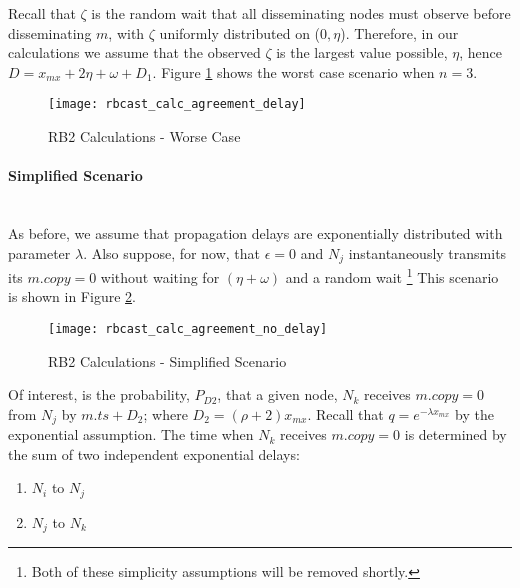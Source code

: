     Recall that $\zeta$ is the random wait that all disseminating nodes must observe before disseminating $m$, with $\zeta$ uniformly distributed on ($0, \eta$).  Therefore, in our calculations we assume that the observed $\zeta$ is the largest value possible, $\eta$, hence $D = x_{mx} + 2\eta + \omega + D_1$.  Figure \ref{fig:rbcast_a_delay} shows the worst case scenario when $n=3$.  
    
    \begin{figure}[H]
                \centering    
                \centerline{\texttt{[image: rbcast\_calc\_agreement\_delay]}}
                \caption[RB2 Calculations - Worse Case]{RB2 Calculations - Worse Case}
                 \label{fig:rbcast_a_delay}
        \end{figure} 
    
    \paragraph{Simplified Scenario} \hfill \\    
    As before, we assume that propagation delays are exponentially distributed with parameter $\lambda$.  Also suppose, for now, that $\epsilon = 0$ and $N_j$ instantaneously transmits its $m.copy = 0$ without waiting for $(\eta + \omega)$ and a random wait \footnote{Both of these simplicity assumptions will be removed shortly.}  This scenario is shown in Figure \ref{fig:rbcast_a_no_delay}.  
    
        \begin{figure}[h]
                \centering    
                \centerline{\texttt{[image: rbcast\_calc\_agreement\_no\_delay]}}
                \caption[RB2 Calculations - Simplified Scenario]{RB2 Calculations - Simplified Scenario}
                \label{fig:rbcast_a_no_delay}
        \end{figure} 
        
    Of interest, is the probability, $P_{D2}$, that a given node, $N_k$ receives $m.copy = 0$ from $N_j$ by $m.ts + D_2$; where $D_2 = (\rho + 2) x_{mx}$.  Recall that $q  = e^{-\lambda x_{mx}}$ by the exponential assumption.  The time when $N_k$ receives $m.copy = 0$ is determined by the sum of two independent exponential delays:
    \begin{enumerate}[label=\roman*]
        \item    $N_i$ to $N_j$
        \item    $N_j$ to $N_k$
    \end{enumerate}
    
